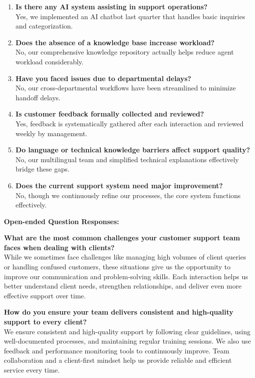 \begin{enumerate}
    \item \textbf{Is there any AI system assisting in support operations?}\\
    Yes, we implemented an AI chatbot last quarter that handles basic inquiries and categorization.
    
    \item \textbf{Does the absence of a knowledge base increase workload?}\\
    No, our comprehensive knowledge repository actually helps reduce agent workload considerably.
    
    \item \textbf{Have you faced issues due to departmental delays?}\\
    No, our cross-departmental workflows have been streamlined to minimize handoff delays.
    
    \item \textbf{Is customer feedback formally collected and reviewed?}\\
    Yes, feedback is systematically gathered after each interaction and reviewed weekly by management.
    
    \item \textbf{Do language or technical knowledge barriers affect support quality?}\\
    No, our multilingual team and simplified technical explanations effectively bridge these gaps.
    
    \item \textbf{Does the current support system need major improvement?}\\
    No, though we continuously refine our processes, the core system functions effectively.
\end{enumerate}

\textbf{Open-ended Question Responses:}

\textbf{What are the most common challenges your customer support team faces when dealing with clients?}\\
While we sometimes face challenges like managing high volumes of client queries or handling confused customers, these situations give us the opportunity to improve our communication and problem-solving skills. Each interaction helps us better understand client needs, strengthen relationships, and deliver even more effective support over time.

\textbf{How do you ensure your team delivers consistent and high-quality support to every client?}\\
We ensure consistent and high-quality support by following clear guidelines, using well-documented processes, and maintaining regular training sessions. We also use feedback and performance monitoring tools to continuously improve. Team collaboration and a client-first mindset help us provide reliable and efficient service every time.

